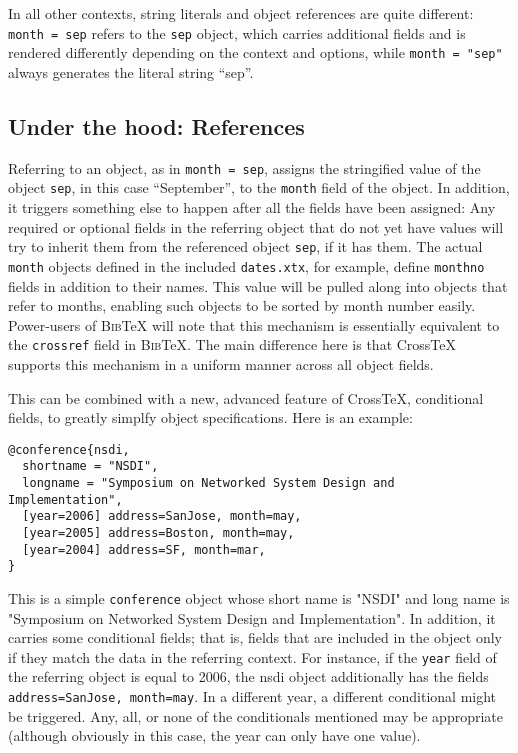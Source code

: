 \documentclass{article}
\newcommand{\XTeX}{Cross\TeX}
\newcommand{\BibTeX}{\textsc{Bib}\TeX}
\begin{document}
In all other contexts, string literals and object references are quite different: \texttt{month = sep} refers to the \texttt{sep} object, which carries additional fields and is rendered differently depending on the context and options, while \texttt{month = "sep"} always generates the literal string ``sep''.

\subsection{Under the hood: References}

Referring to an object, as in \texttt{month = sep}, assigns the stringified value of the object \texttt{sep}, in this case ``September'', to the \texttt{month} field of the object. In addition, it triggers something else to happen after all the fields have been assigned: Any required or optional fields in the referring object that do not yet have values will try to inherit them from the referenced object \texttt{sep}, if it has them. The actual \texttt{month} objects defined in the included \texttt{dates.xtx}, for example, define \texttt{monthno} fields in addition to their names. This value will be pulled along into objects that refer to months, enabling such objects to be sorted by month number easily. Power-users of \BibTeX{} will note that this mechanism is essentially equivalent to the \texttt{crossref} field in \BibTeX{}. The main difference here is that \XTeX{} supports this mechanism in a uniform manner across all object fields.

This can be combined with a new, advanced feature of \XTeX{}, conditional fields, to greatly simplfy object specifications. Here is an example:

\begin{small}\begin{verbatim}
@conference{nsdi,
  shortname = "NSDI",
  longname = "Symposium on Networked System Design and Implementation", 
  [year=2006] address=SanJose, month=may,
  [year=2005] address=Boston, month=may,
  [year=2004] address=SF, month=mar,
}
\end{verbatim}\end{small}

This is a simple \texttt{conference} object whose short name is "NSDI"
and long name is "Symposium on Networked System Design and
Implementation". In addition, it carries some conditional fields; that is, 
fields that are included in the object only if they match the data in the
referring context. For instance, if the \texttt{year} field of the referring object is equal to 2006, the nsdi object additionally has the fields \texttt{address=SanJose, month=may}. In a different year, a different conditional might be triggered. Any, all, or none of the conditionals mentioned may be appropriate (although obviously in this case, the year can only have one value).
\end{document}
